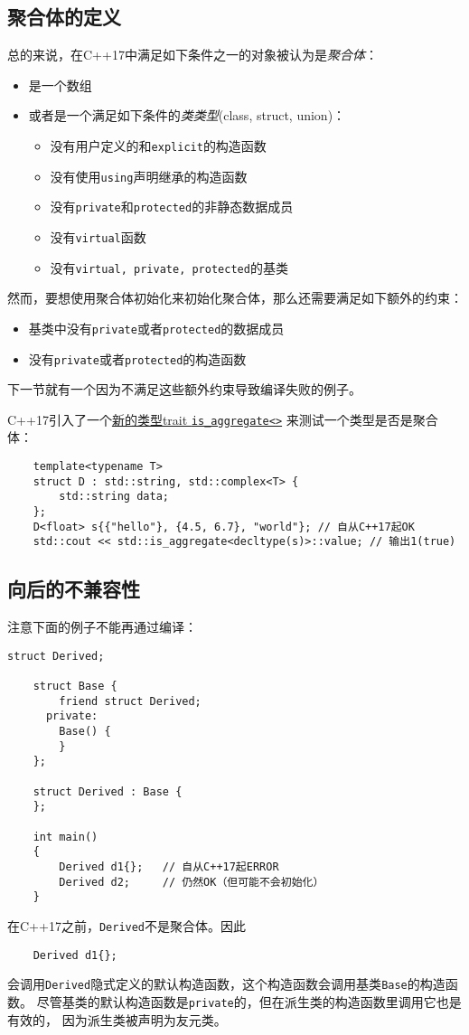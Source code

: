 \subsection{聚合体的定义}
总的来说，在C++17中满足如下条件之一的对象被认为是\emph{聚合体}：
\begin{itemize}[leftmargin=*]
    \item 是一个数组
    \item 或者是一个满足如下条件的\emph{类类型}(class, struct, union)：
    \begin{itemize}[leftmargin=*]
        \item 没有用户定义的和\texttt{explicit}的构造函数
        \item 没有使用\texttt{using}声明继承的构造函数
        \item 没有\texttt{private}和\texttt{protected}的非静态数据成员
        \item 没有\texttt{virtual}函数
        \item 没有\texttt{virtual, private, protected}的基类
    \end{itemize}
\end{itemize}
然而，要想使用聚合体初始化来初始化聚合体，那么还需要满足如下额外的约束：
\begin{itemize}[leftmargin=*]
    \item 基类中没有\texttt{private}或者\texttt{protected}的数据成员
    \item 没有\texttt{private}或者\texttt{protected}的构造函数
\end{itemize}
下一节就有一个因为不满足这些额外约束导致编译失败的例子。

C++17引入了一个\hyperref[ch21.2.1]{新的类型trait \texttt{is\_aggregate<>}}
来测试一个类型是否是聚合体：
\begin{lstlisting}
    template<typename T>
    struct D : std::string, std::complex<T> {
        std::string data;
    };
    D<float> s{{"hello"}, {4.5, 6.7}, "world"}; // 自从C++17起OK
    std::cout << std::is_aggregate<decltype(s)>::value; // 输出1(true)
\end{lstlisting}

\subsection{向后的不兼容性}
注意下面的例子不能再通过编译：
\begin{lstlisting}[frame=single, title=lang/aggr14.cpp]
    struct Derived;

    struct Base {
        friend struct Derived;
      private:
        Base() {
        }
    };

    struct Derived : Base {
    };

    int main()
    {
        Derived d1{};   // 自从C++17起ERROR
        Derived d2;     // 仍然OK（但可能不会初始化）
    }
\end{lstlisting}
在C++17之前，\texttt{Derived}不是聚合体。因此
\begin{lstlisting}
    Derived d1{};
\end{lstlisting}
会调用\texttt{Derived}隐式定义的默认构造函数，这个构造函数会调用基类\texttt{Base}的构造函数。
尽管基类的默认构造函数是\texttt{private}的，但在派生类的构造函数里调用它也是有效的，
因为派生类被声明为友元类。

